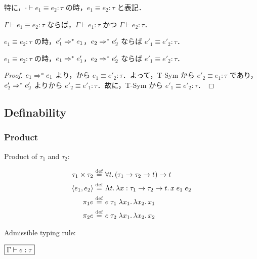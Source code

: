 特に，$\cdot \vdash e_1 \equiv e_2: \tau$ の時，$e_1 \equiv e_2: \tau$ と表記．

\begin{theorem}
  $\Gamma \vdash e_1 \equiv e_2: \tau$ ならば，$\Gamma \vdash e_1: \tau$ かつ $\Gamma \vdash e_2: \tau$．
\end{theorem}

\begin{theorem}
  $e_1 \equiv e_2: \tau$ の時，$e'_1 \Rightarrow^* e_1$，$e_2 \Rightarrow^* e'_2$ ならば $e'_1 \equiv e'_2: \tau$．
\end{theorem}

\begin{corollary}
  $e_1 \equiv e_2: \tau$ の時，$e_1 \Rightarrow^* e'_1$，$e_2 \Rightarrow^* e'_2$ ならば $e'_1 \equiv e'_2: \tau$．
\end{corollary}
\begin{proof}
  $e_1 \Rightarrow^* e_1$ より，から $e_1 \equiv e'_2: \tau$．よって，T-Sym から $e'_2 \equiv e_1: \tau$ であり，$e'_2 \Rightarrow^* e'_2$ よりから $e'_2 \equiv e'_1: \tau$．故に，T-Sym から $e'_1 \equiv e'_2: \tau$．
\end{proof}

\subsection{Definability}

\subsubsection{Product}

Product of $\tau_1$ and $\tau_2$:

\begin{align*}
  \tau_1 \times \tau_2 &\mathrel{\overset{\mathrm{def}}{=}} \forall t\ldotp (\tau_1 \to \tau_2 \to t) \to t \\
  \langle e_1, e_2\rangle &\mathrel{\overset{\mathrm{def}}{=}} \Lambda t\ldotp \lambda x: \tau_1 \to \tau_2 \to t\ldotp x\; e_1\; e_2 \\
  \pi_1 e &\mathrel{\overset{\mathrm{def}}{=}} e\; \tau_1\; \lambda x_1\ldotp \lambda x_2\ldotp x_1 \\
  \pi_2 e &\mathrel{\overset{\mathrm{def}}{=}} e\; \tau_2\; \lambda x_1\ldotp \lambda x_2\ldotp x_2
\end{align*}

Admissible typing rule:

$\fbox{$\Gamma \vdash e: \tau$}$

